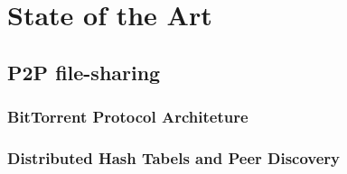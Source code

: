 \chapter{State of the Art}
\label{chap:state_of_the_art}

\section{P2P file-sharing}%
\label{sec:p2p_networks}

\subsection{BitTorrent Protocol Architeture}%
\label{subsec:bittorrent_protocol_architeture}



\subsection{Distributed Hash Tabels and Peer Discovery}%
\label{subsec:dht_and_pd}

